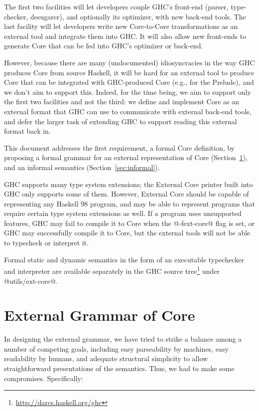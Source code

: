 \documentclass[10pt]{article}
\begin{document}
The first two facilities will let developers couple GHC's front-end (parser,
type-checker, desugarer), and optionally its optimizer, with new back-end tools.
The last facility will let developers write new Core-to-Core 
transformations as an external tool and integrate them into GHC. It will also
allow new front-ends to generate Core that can be fed into GHC's optimizer or 
back-end.

However, because there are many (undocumented)
idiosyncracies in the way GHC produces Core from source Haskell, it will be hard
for an external tool to produce Core that can be integrated with GHC-produced Core 
(e.g., for the Prelude), and we don't aim to support this. Indeed, for the time being, we aim to support only the first two facilities and not the third: we define and implement Core as an external format that GHC can use to communicate with external back-end tools, and defer the larger task of extending GHC to support reading this external format back in.

This document addresses the first requirement, a formal Core definition,
by proposing  a formal grammar for an external representation of Core
(Section~\ref{sec:external}), and 
an informal semantics (Section~\ref{sec:informal}).

GHC supports many type system extensions; the External Core printer built into GHC only supports some of them. However, External Core should be capable of representing any Haskell 98 program, and may be able to represent programs that require certain type system extensions as well. If a program uses unsupported features, GHC may fail to compile it to Core when the @-fext-core@ flag is set, or GHC may successfully compile it to Core, but the external tools will not be able to typecheck or interpret it.
 
Formal static and dynamic semantics in the form of an executable typechecker and interpreter
are available separately in the GHC source tree\footnote{\url{http://darcs.haskell.org/ghc}} under @utils/ext-core@.

\section{External Grammar of Core}
\label{sec:external}

In designing the external grammar, we have tried to strike a balance among
a number of competing goals, including easy parseability by machines,
easy readability by humans, and adequate structural simplicity to 
allow straightforward presentations of the semantics. Thus, we had to make some compromises. Specifically:
\end{document}
